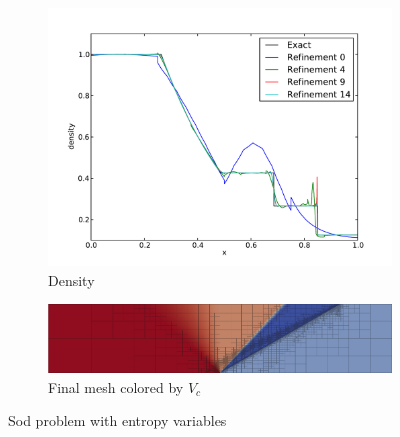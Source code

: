 \documentclass[Dissertation.tex]{subfiles}
\begin{document}
\begin{figure}[ht]
\centering
\begin{subfigure}[t]{\textwidth}
\centering
\includegraphics[width=\textwidth]{Dissertation/Sod/FormulationComparison/entropy-den.pdf}
\caption{Density}
\end{subfigure}
\begin{subfigure}[t]{0.9\textwidth}
\centering
\includegraphics[width=\textwidth]{Sod/FormulationComparison/Form2Mesh15.png}
\caption{Final mesh colored by $V_c$}
\end{subfigure}
\caption{Sod problem with entropy variables}
\label{fig:SodEntropy}
\end{figure}
\end{document}
